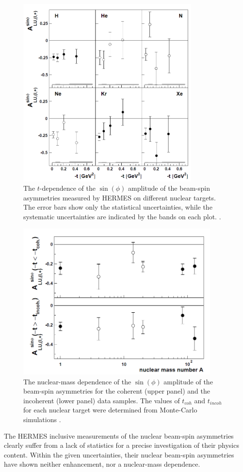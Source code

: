 \begin{figure}[tbp]
\centering
\includegraphics[height=9.7cm]{fig/HERMES_BSA.png}
\caption{The $t$-dependence of the $\sin(\phi)$ amplitude of the beam-spin asymmetries measured by HERMES on different nuclear targets. The error bars show only the statistical uncertainties, while the systematic uncertainties are indicated by the bands on each plot. \cite{HERMES_BSA}.} 
\label{fig:HERMES_BSA}
\end{figure}
\begin{figure}[tbp]
\centering
\includegraphics[height=8.0cm]{fig/HERMES_BSA_2.png}
\caption{The nuclear-mass dependence of the $\sin(\phi)$ amplitude of the beam-spin asymmetries for the coherent (upper panel) and the incoherent (lower panel) data samples. The values of $t_{coh}$ and $t_{incoh}$ for each nuclear target were determined from Monte-Carlo simulations \cite{HERMES_BSA}.}
\label{fig:HERMES_BSA_1}
\end{figure}

The HERMES inclusive measurements of the nuclear beam-spin asymmetries clearly suffer from a lack of statistics for a precise investigation of their physics content. Within the given uncertainties, their nuclear beam-spin asymmetries have shown neither enhancement, nor a nuclear-mass dependence.  




